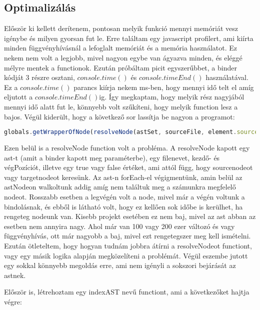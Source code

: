 \subsection{Optimalizálás}

\noindent

Először ki kellett derítenem, pontosan melyik funkció mennyi memóriát vesz igénybe és milyen gyorsan fut le.
Erre találtam egy javascript profilert, ami kiírta minden függvényhívásnál a lefoglalt memóriát és a memória használatot.
Ez nekem nem volt a legjobb, mivel nagyon egybe van ágyazva minden, és eléggé mélyre mentek a functionok.
Ezután próbáltam picit egyszerűbbet, a binder kódját 3 részre osztani, ${console.time()}$ és ${console.timeEnd()}$ használatával.
Ez a ${console.time()}$ parancs kiírja nekem ms-ben, hogy mennyi idő telt el amíg eljutott a ${console.timeEnd()}$ig.
Így megkaptam, hogy melyik rész nagyjából mennyi idő alatt fut le, könnyebb volt szűkíteni, hogy melyik function lesz a bajos.
Végül kiderült, hogy a következő sor lassítja be nagyon a programot:

\begin{lstlisting}[caption={Problémás function}, label={lst:binder_problemas_function}, language={JavaScript}]
globals.getWrapperOfNode(resolveNode(astSet, sourceFile, element.source.range.start, element.source.range.end, true));
\end{lstlisting}

Ezen belül is a resolveNode function volt a probléma.
A resolveNode kapott egy ast-t (amit a binder kapott meg paraméterbe), egy filenevet, kezdő- és végPozíciót, illetve egy true vagy false értéket, ami attól függ, hogy sourcenodeot vagy targetnodeot keresünk.
Az ast-n forEach-el végigmentünk, amin belül az astNodeon walkoltunk addig amíg nem találtuk meg a számunkra megfelelő nodeot.
Rosszabb esetben a legvégén volt a node, mivel már a végén voltunk a bindolásnak, és ebből is látható volt, hogy ez kellően sok időbe is kerülhet, ha rengeteg nodeunk van.
Kisebb projekt esetében ez nem baj, mivel az ast abban az esetben nem annyira nagy.
Ahol már van 100 vagy 200 ezer változó és vagy függvényhívás, ott már nagyobb a baj, mivel ezt rengetegszer meg kell ismételni.
Ezután ötleteltem, hogy hogyan tudnám jobbra átírni a resolveNodeot functiont, vagy egy másik logika alapján megközelíteni a problémát.
Végül eszembe jutott egy sokkal könnyebb megoldás erre, ami nem igényli a sokszori bejárását az astnek.
\noindent

Először is, létrehoztam egy indexAST nevű functiont, ami a következőket hajtja végre:

